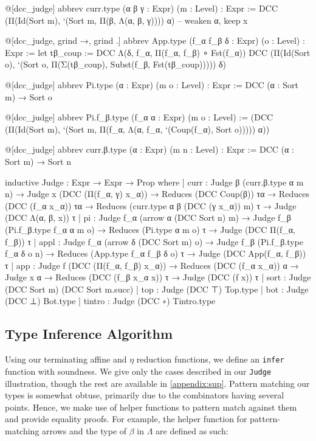 \documentclass{article}
\begin{document}
\begin{leancode}
@[dcc_judge] abbrev curr.type (α β γ : Expr) (m : Level) : Expr :=
  DCC (Π(Id(Sort m), `(Sort m, Π(β, Λ(α, β, γ)))) α) -- weaken α, keep x

@[dcc_judge, grind →, grind .] abbrev App.type (f_α f_β δ : Expr) (o : Level) : Expr :=
  let tβ_coup := DCC Λ(δ, f_α, Π(f_α, f_β) ∘ Fst(f_α))
  DCC (Π(Id(Sort o), `(Sort o, Π(Σ(tβ_coup), Subst(f_β, Fst(tβ_coup))))) δ)

@[dcc_judge] abbrev Pi.type (α : Expr) (m o : Level) : Expr :=
  DCC (α : Sort m) → Sort o

@[dcc_judge] abbrev Pi.f_β.type (f_α α : Expr) (m o : Level) :=
  (DCC (Π(Id(Sort m), `(Sort m, Π(f_α, Λ(α, f_α, `(Coup(f_α), Sort o))))) α))

@[dcc_judge] abbrev curr.β.type (α : Expr) (m n : Level) : Expr :=
  DCC (α : Sort m) → Sort n

inductive Judge : Expr → Expr → Prop where
  | curr   : Judge β (curr.β.type α m n)
    → Judge x (DCC (Π(f_α, γ) x_α))
    → Reduces (DCC Coup(β)) τα
    → Reduces (DCC (f_α x_α)) τα
    → Reduces (curr.type α β (DCC (γ x_α)) m) τ
    → Judge (DCC Λ(α, β, x)) τ
  | pi     : Judge f_α (arrow α (DCC Sort n) m)
    → Judge f_β (Pi.f_β.type f_α α m o)
    → Reduces (Pi.type α m o) τ
    → Judge (DCC Π(f_α, f_β)) τ
  | appl   : Judge f_α (arrow δ (DCC Sort m) o)
    → Judge f_β (Pi.f_β.type f_α δ o n)
    → Reduces (App.type f_α f_β δ o) τ
    → Judge (DCC App(f_α, f_β)) τ
  | app    : Judge f (DCC (Π(f_α, f_β) x_α))
    → Reduces (DCC (f_α x_α)) α
    → Judge x α
    → Reduces (DCC (f_β x_α x)) τ
    → Judge (DCC (f x)) τ
  | sort   : Judge (DCC Sort m) (DCC Sort m.succ)
  | top    : Judge (DCC ⊤) Top.type
  | bot    : Judge (DCC ⊥) Bot.type
  | tintro : Judge (DCC ∗) Tintro.type
\end{leancode}

\subsection{Type Inference Algorithm}

Using our terminating affine and \(\eta\) reduction functions, we define an \texttt{infer} function with soundness. We give only the cases described in our \texttt{Judge} illustration, though the rest are available in \eqref{appendix:sup}. Pattern matching our types is somewhat obtuse, primarily due to the combinators having several points. Hence, we make use of helper functions to pattern match against them and provide equality proofs. For example, the helper function for pattern-matching arrows and the type of \(\beta\) in \(\Lambda\) are defined as such:
\end{document}
